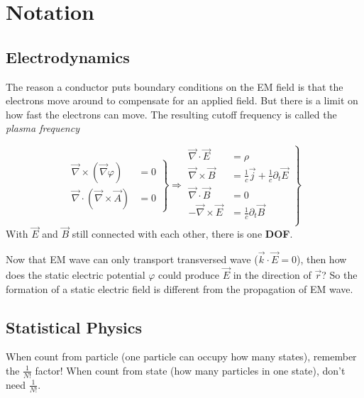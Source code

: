 \section{Notation}
\subsection{Electrodynamics}

The reason a conductor puts boundary conditions on the EM field is that the
electrons move around to compensate for an applied field. But there is a
limit on how fast the electrons can move. The resulting cutoff frequency is
called the \textit{plasma frequency}
\begin{description}[style=nextline]
    \item [Maxwell Eqn] 
	\begin{equation}
	    \left.
	    \begin{aligned}
		\vec{\nabla} \times (\vec{\nabla} \varphi) &= 0 \\
		\vec{\nabla} \cdot (\vec{\nabla} \times \vec{A}) &= 0
	    \end{aligned}
	    \right\} 
	    \Rightarrow 
	    \left.
	    \begin{aligned}
		\vec{\nabla} \cdot \vec{E} &= \rho \\
		\vec{\nabla} \times \vec{B} &=
		\frac{1}{c} \vec{j} + \frac{1}{c}\partial_{t}\vec{E}   \\
		\vec{\nabla} \cdot \vec{B} &= 0	\\
		-\vec{\nabla} \times \vec{E} &=
		\frac{1}{c} \partial_{t}\vec{B}   \\
	    \end{aligned}
	    \right\}	
	\end{equation}
	With $\vec{E}$ and $\vec{B}$ still connected
	with each other, there is one \textbf{DOF}.
\end{description}

Now that EM wave can only transport transversed wave ($\vec{k}\cdot\vec{E} =0$), then
how does the static electric potential $\varphi$ could produce $\vec{E}$ in
the direction of $\vec{r}$? So the formation of a static electric field is 
different from the propagation of EM wave.


\subsection{Statistical Physics}
\begin{description}[style=nextline]
    \item [Partisian func] When count from particle (one particle can occupy
	how many states), remember the $\frac{1}{N!}$ factor! When count from
	state (how many particles in one state), don't need $\frac{1}{N!}$.
\end{description}

